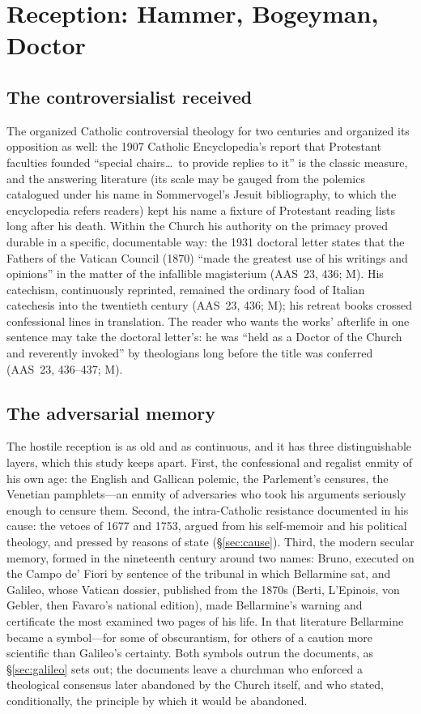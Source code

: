 \section{Reception: Hammer, Bogeyman, Doctor}
\label{sec:reception}

\subsection{The controversialist received}

The  organized Catholic controversial theology
for two centuries and organized its opposition as well: the 1907
Catholic Encyclopedia's report that Protestant faculties founded
``special chairs\ldots\ to provide replies to it'' is the classic
measure, and the answering literature (its scale may be gauged
from the polemics catalogued under his name in Sommervogel's
Jesuit bibliography, to which the encyclopedia refers readers)
kept his name a fixture of Protestant reading lists long after
his death. Within the Church his authority on the
primacy proved durable in a specific, documentable way: the 1931
doctoral letter states that the Fathers of the Vatican Council
(1870) ``made the greatest use of his writings and opinions''
in the matter of the infallible magisterium (AAS~23, 436; M). His
catechism, continuously reprinted, remained the ordinary food of
Italian catechesis into the twentieth century (AAS~23, 436; M);
his retreat books crossed confessional lines in translation. The
reader who wants the works' afterlife in one sentence may take
the doctoral letter's: he was ``held as a Doctor of the Church
and reverently invoked'' by theologians long before the title was
conferred (AAS~23, 436--437; M).

\subsection{The adversarial memory}

The hostile reception is as old and as continuous, and it has
three distinguishable layers, which this study keeps apart.
First, the confessional and regalist enmity of his own age: the
English and Gallican polemic, the Parlement's censures, the
Venetian pamphlets---an enmity of adversaries who took his
arguments seriously enough to censure them. Second, the
intra-Catholic resistance documented in his cause: the vetoes of
1677 and 1753, argued from his self-memoir and his political
theology, and pressed by reasons of state (\S\ref{sec:cause}).
Third, the modern secular memory, formed in the nineteenth
century around two names: Bruno, executed on the Campo de' Fiori
by sentence of the tribunal in which Bellarmine sat, and Galileo,
whose Vatican dossier, published from the 1870s (Berti,
L'Epinois, von Gebler, then Favaro's national edition), made
Bellarmine's warning and certificate the most examined two pages
of his life. In that literature Bellarmine became a symbol---for
some of obscurantism, for others of a caution more scientific
than Galileo's certainty. Both symbols outrun the documents, as
\S\ref{sec:galileo} sets out; the documents leave a churchman who
enforced a theological consensus later abandoned by the Church
itself, and who stated, conditionally, the principle by which it
would be abandoned.

